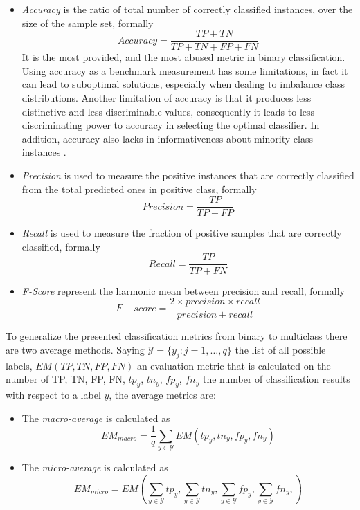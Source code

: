 \begin{itemize}
	\item \textit{Accuracy} is the ratio of total number of correctly classified instances, over the size of the sample set, formally
	\[ Accuracy = \frac{TP + TN}{TP + TN + FP + FN} \]
	It is the most provided, and the most abused metric in binary classification. Using accuracy as a benchmark measurement has some limitations, in fact it can lead to suboptimal solutions, especially when dealing to imbalance class distributions. Another limitation of accuracy is that it produces less distinctive and less discriminable values, consequently it leads to less discriminating power to accuracy in selecting the optimal classifier. In addition, accuracy also lacks in informativeness about minority class instances \cite{article-ev-metrics}.
	
	\item \textit{Precision} is used to measure the positive instances that are correctly classified from the total predicted ones in positive class, formally
	\[ Precision = \frac{TP}{TP + FP} \]
	
	\item \textit{Recall} is used to measure the fraction of positive samples that are correctly classified, formally
	\[ Recall = \frac{TP}{TP + FN} \]
	
	\item \textit{F-Score} represent the harmonic mean between precision and recall, formally
	\[ F-score = \frac{2 \times precision \times recall}{precision + recall} \]
\end{itemize}

To generalize the presented classification metrics from binary to multiclass there are two average methods. Saying $\mathcal{Y}=\{y_j : j = 1, \dots, q\}$ the list of all possible labels, $EM(TP, TN, FP, FN)$ an evaluation metric that is calculated on the number of \ac{TP}, \ac{TN}, \ac{FP}, \ac{FN}, $tp_y$, $tn_y$, $fp_y$, $fn_y$ the number of classification results with respect to a label $y$, the average metrics are:

\begin{itemize}
	\item The \textit{macro-average} is calculated as
	\[ EM_{macro} = \frac{1}{q} \sum_{y \in \mathcal{Y}} EM(tp_y, tn_y, fp_y, fn_y) \]
	
	\item The \textit{micro-average} is calculated as
	\[ EM_{micro} = EM \left( \sum_{y \in \mathcal{Y}} tp_y, \sum_{y \in \mathcal{Y}} tn_y, \sum_{y \in \mathcal{Y}} fp_y, \sum_{y \in \mathcal{Y}} fn_y,  \right) \]
\end{itemize}

